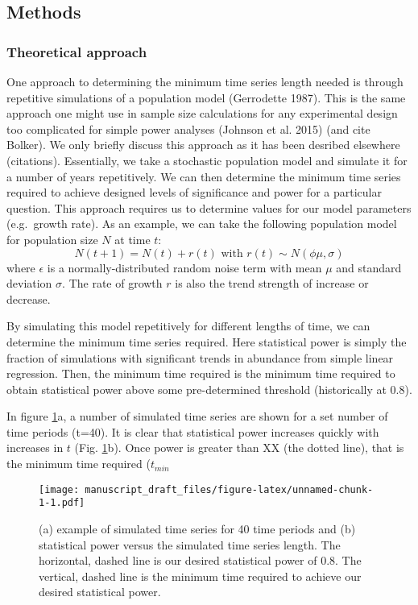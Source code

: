 \documentclass[12pt,]{article}
\begin{document}
\subsection{Methods}\label{methods}

\subsubsection{Theoretical approach}\label{theoretical-approach}

One approach to determining the minimum time series length needed is
through repetitive simulations of a population model (Gerrodette 1987).
This is the same approach one might use in sample size calculations for
any experimental design too complicated for simple power analyses
(Johnson et al. 2015) (and cite Bolker). We only briefly discuss this
approach as it has been desribed elsewhere (citations). Essentially, we
take a stochastic population model and simulate it for a number of years
repetitively. We can then determine the minimum time series required to
achieve designed levels of significance and power for a particular
question. This approach requires us to determine values for our model
parameters (e.g.~growth rate). As an example, we can take the following
population model for population size \(N\) at time \(t\): \[
N(t + 1) = N(t) + r(t) \mbox{ with } r(t) \sim N(\phi \mu, \sigma)
\] where \(\epsilon\) is a normally-distributed random noise term with
mean \(\mu\) and standard deviation \(\sigma\). The rate of growth \(r\)
is also the trend strength of increase or decrease.

By simulating this model repetitively for different lengths of time, we
can determine the minimum time series required. Here statistical power
is simply the fraction of simulations with significant trends in
abundance from simple linear regression. Then, the minimum time required
is the minimum time required to obtain statistical power above some
pre-determined threshold (historically at 0.8).

In figure \ref{fig:theoretical_approach}a, a number of simulated time
series are shown for a set number of time periods (t=40). It is clear
that statistical power increases quickly with increases in \(t\) (Fig.
\ref{fig:theoretical_approach}b). Once power is greater than XX (the
dotted line), that is the minimum time required (\(t_{min}\)

\begin{figure}[htbp]
\centering
\texttt{[image: manuscript\_draft\_files/figure-latex/unnamed-chunk-1-1.pdf]}
\caption{(a) example of simulated time series for 40 time periods and
(b) statistical power versus the simulated time series length. The
horizontal, dashed line is our desired statistical power of 0.8. The
vertical, dashed line is the minimum time required to achieve our
desired statistical power.\label{fig:theoretical_approach}}
\end{figure}
\end{document}
